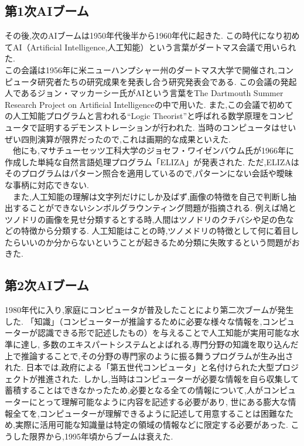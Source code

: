 \subsection{第1次AIブーム}
その後,次のAIブームは1950年代後半から1960年代に起きた.
この時代になり初めてAI（Artificial Intelligence,人工知能）という言葉がダートマス会議で用いられた.\\
この会議は1956年に米ニューハンプシャー州のダートマス大学で開催され,コンピュータ研究者たちの研究成果を発表し合う研究発表会である.
この会議の発起人であるジョン・マッカーシー氏がAIという言葉をThe Dartmouth Summer Research Project on Artificial Intelligence\cite{ronbun2}の中で用いた.
また,この会議で初めての人工知能プログラムと言われる“Logic Theorist”と呼ばれる数学原理をコンピュータで証明するデモンストレーションが行われた.
当時のコンピュータはせいぜい四則演算が限界だったので,これは画期的な成果といえた.\\
　他にも,マサチューセッツ工科大学のジョセフ・ワイゼンバウム氏が1966年に作成した単純な自然言語処理プログラム「ELIZA」が発表された.
ただ,ELIZAはそのプログラムはパターン照合を適用しているので,パターンにない会話や曖昧な事柄に対応できない.\\
　また,人工知能の理解は文字列だけにしか及ばず,画像の特徴を自己で判断し抽出することができないシンボルグラウンティング問題が指摘される.
例えば鳩とツノドリの画像を見せ分類するとする時,人間はツノドリのクチバシや足の色などの特徴から分類する.
人工知能はことの時,ツノメドリの特徴として何に着目したらいいのか分からないということが起きるため分類に失敗するという問題がおきた.
\subsection{第2次AIブーム}
1980年代に入り,家庭にコンピュータが普及したことにより第二次ブームが発生した.
「知識」（コンピューターが推論するために必要な様々な情報を,コンピューターが認識できる形で記述したもの）を与えることで人工知能が実用可能な水準に達し,
多数のエキスパートシステムとよばれる,専門分野の知識を取り込んだ上で推論することで,その分野の専門家のように振る舞うプログラムが生み出された.
日本では,政府による「第五世代コンピュータ」と名付けられた大型プロジェクトが推進された.
しかし,当時はコンピューターが必要な情報を自ら収集して蓄積することはできなかったため,必要となる全ての情報について,人がコンピューターにとって理解可能なように内容を記述する必要があり,
世にある膨大な情報全てを,コンピューターが理解できるように記述して用意することは困難なため,実際に活用可能な知識量は特定の領域の情報などに限定する必要があった.
こうした限界から,1995年頃からブームは衰えた.
